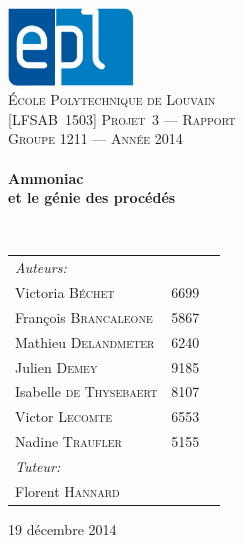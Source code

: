 \begin{titlepage}
\begin{center}

\includegraphics[width=0.25\textwidth]{img/epl-logo}~\\[1cm]

\textsc{\LARGE École Polytechnique de Louvain}\\[0.7cm]
\textsc{\Large [LFSAB~1503] Projet~3 --- Rapport}\\[0.8cm]

\textsc{\Large Groupe 1211 --- Année 2014}\\[0.5cm]

\HRule \\[0.3cm]
{ \huge \bfseries Ammoniac \\ et le génie des procédés \\[0.3cm] }

\HRule \\[0.8cm]

{\large
\begin{tabu} to 0.7\linewidth {Xll}
    \emph{Auteurs:}\\
    \quad Victoria \textsc{Béchet} & 6699\\
    \quad François \textsc{Brancaleone} & 5867\\
    \quad Mathieu \textsc{Delandmeter} & 6240\\
    \quad Julien \textsc{Demey} & 9185\\
    \quad Isabelle \textsc{de Thysebaert} & 8107\\
    \quad Victor \textsc{Lecomte} & 6553\\
    \quad Nadine \textsc{Traufler} & 5155\\[.5ex]
    
    \emph{Tuteur:}\\
    \quad Florent \textsc{Hannard}\\
\end{tabu}
}

\vfill

{\large 19 décembre 2014}

\end{center}
\end{titlepage}
